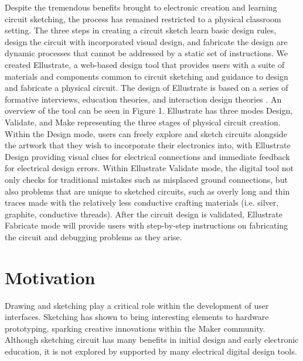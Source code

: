 \documentclass{sigchi}
\begin{document}
Despite the tremendous benefits brought to electronic creation and learning circuit sketching, the process has remained restricted to a physical classroom setting. 
The three steps in creating a circuit sketch \textendash learn basic design rules, design the circuit with incorporated visual design, and fabricate the design \textendash are dynamic processes that cannot be addressed by a static set of instructions. 
We created Ellustrate, a web-based design tool that provides users with a suite of materials and components common to circuit sketching and guidance to design and fabricate a physical circuit. 
The design of Ellustrate is based on a series of formative interviews, education theories, and interaction design theories .
An overview of the tool can be seen in Figure 1. Ellustrate has three modes \textendash Design, Validate, and Make \textendash representing the three stages of physical circuit creation.
Within the Design mode, users can freely explore and sketch circuits alongside the artwork that they wish to incorporate their electronics into, with Ellustrate Design providing visual clues for electrical connections and immediate feedback for electrical design errors.
Within Ellustrate Validate mode, the digital tool not only checks for traditional mistakes such as misplaced ground connections, but also problems that are unique to sketched circuits, such as overly long and thin traces made with the relatively less conductive crafting materials (i.e. silver, graphite, conductive threads). After the circuit design is validated, Ellustrate Fabricate mode will provide users with step-by-step instructions on fabricating the circuit and debugging problems as they arise. 


\section{Motivation}
Drawing and sketching play a critical role within the development of user interfaces. Sketching has shown to bring interesting elements to hardware prototyping, sparking creative innovations within the Maker community. 
Although sketching circuit has many benefits in initial design and early electronic education, it is not explored by supported by many electrical digital design tools.
\end{document}
